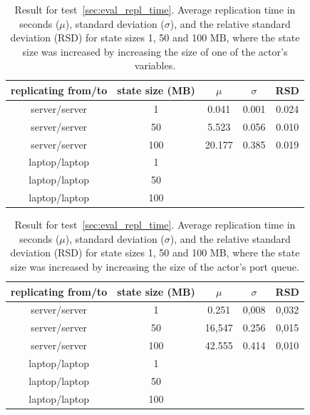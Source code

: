 \documentclass{cslthse-msc}
\begin{document}
 \begin{table}[h!]
	\begin{center}
	\begin{tabular}{| c | c | c | c | c |}
	 \hline
	 replicating from/to & state size (MB) & $\mu$ & $\sigma$ & RSD \\
	 \hline		%
	  server/server & 1 & 0.041 & 0.001 & 0.024 \\
	  server/server & 50 &  5.523 &  0.056 & 0.010 \\
	  server/server & 100 &  20.177 & 0.385 & 0.019 \\
	  laptop/laptop & 1 & \\
	  laptop/laptop & 50 & \\
	  laptop/laptop & 100 & \\
	   \hline
	\end{tabular}
	 \caption{Result for test~\ref{sec:eval_repl_time}. Average replication time in seconds ($\mu$), standard deviation ($\sigma$), and the relative standard deviation (RSD) for state sizes 1, 50 and 100 MB, where the state size was increased by increasing the size of one of the actor's variables.}
	 \label{table:replication_time_variation_variable}
	 \end{center}
 \end{table}
 
\begin{table}[h!]
	\begin{center}
	\begin{tabular}{| c | c | c | c | c |}
	 \hline
	 replicating from/to & state size (MB) & $\mu$ & $\sigma$ & RSD \\
	 \hline		%
	  server/server & 1 & 0.251 & 0,008 & 0,032 \\
	  server/server & 50 & 16,547 & 0.256 & 0,015 \\
	  server/server & 100 & 42.555 & 0.414 & 0,010 \\
	  laptop/laptop & 1 & \\
	  laptop/laptop & 50 &  \\
	  laptop/laptop & 100 &  \\
	   \hline
	\end{tabular}
	 \caption{Result for test~\ref{sec:eval_repl_time}. Average replication time in seconds ($\mu$), standard deviation ($\sigma$), and the relative standard deviation (RSD) for state sizes 1, 50 and 100 MB, where the state size was increased by increasing the size of the actor's port queue.}
	 \label{table:replication_time_variation_queue}
	 \end{center}
 \end{table}
 
\end{document}
